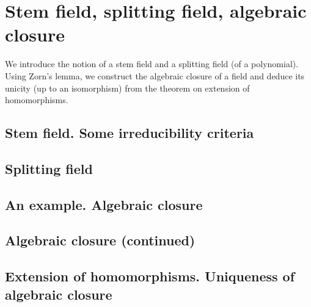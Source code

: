 \chapter{Stem field, splitting field, algebraic closure}
We introduce the notion of a stem field and a splitting field (of a
polynomial). Using Zorn's lemma, we construct the algebraic closure of
a field and deduce its unicity (up to an isomorphism) from the theorem
on extension of homomorphisms.

\section{Stem field. Some irreducibility criteria}
\section{Splitting field}
\section{An example. Algebraic closure}
\section{Algebraic closure (continued)}
\section{Extension of homomorphisms. Uniqueness of algebraic closure}
